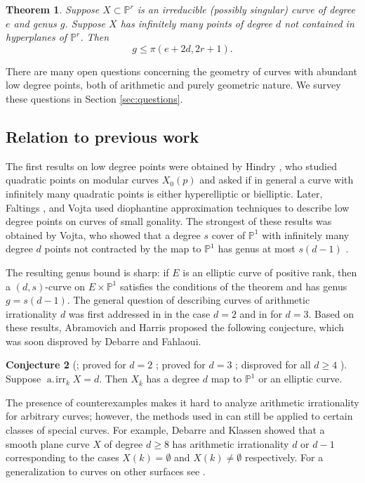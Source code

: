 \documentclass[11pt]{amsart}
\newcommand{\PP}{\mathbb{P}}
\newcommand{\pp}{\mathbb{P}}
\newcommand{\kbar}{{\bar{k}}}
\newcommand{\airr}{\operatorname{a.\!irr}}
\newtheorem{theorem}{Theorem}[section]
\theoremstyle{definition}
\newtheorem{conjecture}[theorem]{Conjecture}
\theoremstyle{remark}
\begin{document}
\begin{theorem}\label{thms:intro-special-curves}
Suppose $X \subset \PP^r$ is an irreducible (possibly singular) curve of degree $e$ and genus $g$. Suppose $X$ has infinitely many points of degree $d$ not contained in hyperplanes of $\PP^r$. Then 
\[g \leqslant \pi(e+2d, 2r+1).\]
\end{theorem}

There are many open questions concerning the geometry of curves with abundant low degree points, both of arithmetic and purely geometric nature. We survey these questions in Section \ref{sec:questions}.

\subsection{Relation to previous work} \label{relation}
 The first results on low degree points were obtained by Hindry \cite{Hindry1987}, who studied quadratic points on modular curves $X_0(p)$ and asked if in general a curve with infinitely many quadratic points is either hyperelliptic or bielliptic. Later, Faltings \cite{Faltings1991}, and Vojta \cite{Vojta1991quadratic} used diophantine approximation techniques to describe low degree points on curves of small gonality. The strongest of these results was obtained by Vojta, who showed that a degree \(s\) cover of \(\pp^1\) with infinitely many degree \(d\) points not contracted by the map to \(\pp^1\) has genus at most \(s(d-1)\) \cite{Vojta1992generalization}.

The resulting genus bound is sharp: if $E$ is an elliptic curve of positive rank, then a $(d,s)$-curve on $E \times \PP^1$ satisfies the conditions of the theorem and has genus $g=s(d-1).$
The general question of describing curves of arithmetic irrationality $d$ was first addressed in \cite{Harris-Silverman1991} in the case $d=2$ and in \cite{Abramovich-Harris1991} for $d=3$. Based on these results, Abramovich and Harris proposed the following conjecture, which was soon disproved by Debarre and Fahlaoui.
\begin{conjecture}[\cite{Abramovich-Harris1991}; proved for \(d=2\) \cite{Harris-Silverman1991}; proved for \(d=3\) \cite{Abramovich-Harris1991}; disproved for all \(d\geqslant 4\) \cite{Debarre-Fahlaoui1993}]
Suppose $\airr_k X = d$. Then $X_\kbar$ has a degree $d$ map to $\PP^1$ or an elliptic curve.
\end{conjecture}
The presence of counterexamples makes it hard to analyze arithmetic irrationality for arbitrary curves; however, the methods used in \cite{Abramovich-Harris1991} can still be applied to certain classes of special curves. For example, Debarre and Klassen \cite{Debarre-Klassen1994} showed that a smooth plane curve $X$ of degree $d \geqslant 8$ has arithmetic irrationality $d$ or $d-1$ corresponding to the cases $X(k)=\emptyset$ and $X(k) \neq \emptyset$ respectively. For a generalization to curves on other surfaces see \cite{Smith-Vogt2020}.
\end{document}
